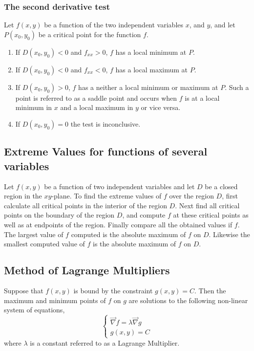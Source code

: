 \documentclass[14pt]{article}
\begin{document}
    \subsubsection{The second derivative test}
    Let $f(x,y)$ be a function of the two independent variables $x$, and $y$, and let $P(x_0, y_0)$ be a critical point for the function $f$.
    \begin{enumerate}
        \item If $D(x_0, y_0)<0$ and $f_{xx}>0$, $f$ has a local minimum at $P$.
        \item If $D(x_0, y_0)<0$ and $f_{xx}<0$, $f$ has a local maximum at $P$.
        \item If $D(x_0, y_0)>0$, $f$ has a neither a local minimum or maximum at $P$. Such a point is referred to as a saddle point and occurs when $f$ is at a local minimum in $x$ and a local maximum in $y$ or vice versa.
        \item If $D(x_0, y_0)=0$ the test is inconclusive.
    \end{enumerate} 
    \subsection{Extreme Values for functions of several variables}
    Let $f(x,y)$ be a function of two independent variables and let $D$ be a closed region in the $xy$-plane. To find the extreme values of $f$ over the region $D$, first calculate all critical points in the interior of the region $D$. 
    Next find all critical points on the boundary of the region $D$, and compute $f$ at these critical points as well as at endpoints of the region. 
    Finally compare all the obtained values if $f$. The largest value of $f$ computed is the absolute maximum of $f$ on $D$. Likewise the smallest computed value of $f$ is the absolute maximum of $f$ on $D$.
    \subsection{Method of Lagrange Multipliers}
    Suppose that $f(x,y)$ is bound by the constraint $g(x,y)=C$. Then the maximum and minimum points of $f$ on $g$ are solutions to the following non-linear system of equations,
    $$\left\{\begin{array}{lr}
        \vec\nabla f=\lambda \vec\nabla g\\
        g(x,y)=C
    \end{array}\right.$$
    where $\lambda$ is a constant referred to as a Lagrange Multiplier.
\end{document}
